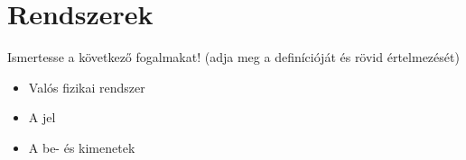\documentclass[../main.tex]{subfiles}
\begin{document}
\section{Rendszerek}

\begin{fulltheorem}
	Ismertesse a következő fogalmakat!
	(adja meg a definícióját és rövid értelmezését)
	\begin{itemize}
		\item Valós fizikai rendszer
		\item A jel
		\item A be- és kimenetek
	\end{itemize}
\end{fulltheorem}
\end{document}

